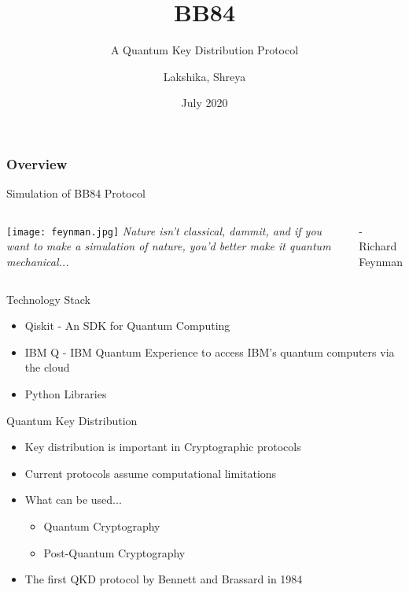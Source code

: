 \documentclass{beamer}
\title[BB84]{BB84}
\subtitle{A Quantum Key Distribution Protocol}
\author[Team 37]{Lakshika, Shreya}
\date{July 2020}
\begin{document}
\begin{frame}
	\titlepage
\end{frame}

\begin{frame}
	\frametitle{Overview}
	 Simulation of BB84 Protocol
\end{frame}


\begin{frame}[standout]
    \begin{columns}
            \centering
            \texttt{[image: feynman.jpg]}
            \emph{Nature isn’t classical, dammit, and if you want to make a simulation of nature, you’d better make it quantum mechanical...}
        \begin{flushright}
            - Richard Feynman
        \end{flushright}
    \end{columns}
\end{frame}


\begin{frame}{Technology Stack}
	\begin{itemize}
		\item Qiskit - An SDK for Quantum Computing
		\item IBM Q - IBM Quantum Experience to access IBM's quantum computers via the cloud
        \item Python Libraries
	\end{itemize}
\end{frame}


\begin{frame}{Quantum Key Distribution}
    \begin{itemize}[<+->]
        \item Key distribution is important in Cryptographic protocols
        \item Current protocols assume computational limitations
        \item What can be used... 
            \begin{itemize}
                \item Quantum Cryptography
                \item Post-Quantum Cryptography
              \end{itemize}
        \item The first QKD protocol by Bennett and Brassard in 1984
     \end{itemize}
\end{frame}
\end{document}
